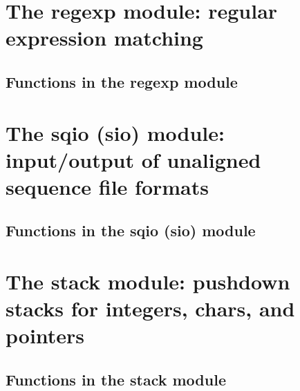 \documentclass[11pt]{article}
\begin{document}
\newpage
\section{The regexp module: regular expression matching}

\subsection{Functions in the regexp module}


\newpage
\section{The sqio (sio) module: input/output of unaligned sequence file formats}

\subsection{Functions in the sqio (sio) module}


\newpage
\section{The stack module: pushdown stacks for integers, chars, and pointers}

\subsection{Functions in the stack module}

\end{document}

